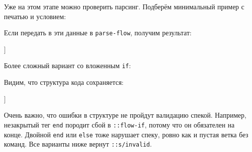 Уже на этом этапе можно проверить парсинг. Подберём минимальный пример с печатью
и условием:

\begin{english}
  \begin{clojure}
  \end{clojure}
\end{english}

Если передать в эти данные в \texttt{parse-flow}, получим результат:

\begin{english}
  \begin{clojure}
[[:if
  {:this {:command "if" :condition "..."}
   :flow [[:cmd {:command "print" :text "this is true"}]]
   :else
   {:this {:command "else"}
    :flow [[:cmd {:command "print" :text "this is false"}]]}
   :end {:command "end"}}]]
  \end{clojure}
\end{english}

Более сложный вариант со вложенным \texttt{if}:

\begin{english}
  \begin{clojure}
  \end{clojure}
\end{english}

\noindent
Видим, что структура кода сохраняется:

\begin{english}
  \begin{clojure}
[[:if
  {:this {:command "if" :condition "..."}
   :flow
   [[:if
     {:this {:command "if" :condition "..."}
      :flow [[:cmd {:command "print" :text "hello"}]]
      :end {:command "end"}}]]
   :end {:command "end"}}]]
  \end{clojure}
\end{english}

Очень важно, что ошибки в структуре не пройдут валидацию спекой. Например,
незакрытый тег \texttt{end} породит сбой в \texttt{::flow-if}, потому что он
обязателен на конце. Двойной \texttt{end} или \texttt{else} тоже нарушает спеку,
ровно как и пустая ветка без команд. Все варианты ниже вернут
\texttt{::s/invalid}.

